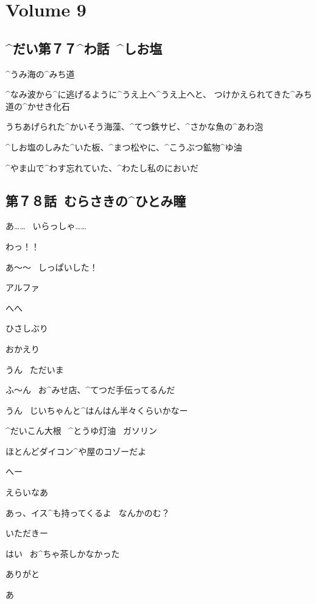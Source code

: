 \section{Volume 9}

\subsection{^{だい}{第}７７^{わ}{話}\ ^{しお}{塩}}

\page[5]
\A ^{うみ}{海}の^{みち}{道}

\A ^{なみ}{波}から^{に}{逃}げるように^{うえ}{上}へ^{うえ}{上}へと、
つけかえられてきた^{みち}{道}の^{かせき}{化石}

\page[8]
\A うちあげられた^{かいそう}{海藻}、^{てつ}{鉄}サビ、^{さかな}{魚}の^{あわ}{泡}

\A ^{しお}{塩}のしみた^{いた}{板}、^{まつ}{松}やに、^{こうぶつ}{鉱物}^{ゆ}{油}

\page
\A ^{やま}{山}で^{わす}{忘}れていた、^{わたし}{私}のにおいだ


\subsection{第７８話\ むらさきの^{ひとみ}{瞳}}

\page[15]
\T あ……
\ いらっしゃ……

\page
\A わっ！！

\A あ〜〜
\ しっぱいした！

\T アルファ

\A へへ

\A ひさしぶり

\page
\T おかえり

\A うん
\ ただいま

\A ふ〜ん
\ お^{みせ}{店}、^{てつだ}{手伝}ってるんだ

\T うん
\ じいちゃんと^{はんはん}{半々}くらいかなー

\Sign ^{だいこん}{大根}
\ ^{とうゆ}{灯油}
\ ガソリン

\T ほとんどダイコン^{や}{屋}のコゾーだよ

\A へー

\page
\A えらいなあ

\T あっ、イス^{も}{持}ってくるよ
\ なんかのむ？

\A いただきー

\page
\T はい
\ お^{ちゃ}{茶}しかなかった

\A ありがと

\page[21]
\T あ


